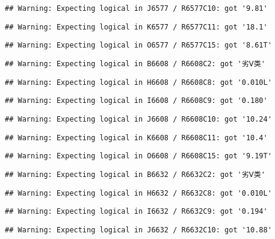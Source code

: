 \documentclass[
]{article}
\begin{document}
\begin{verbatim}
## Warning: Expecting logical in J6577 / R6577C10: got '9.81'
\end{verbatim}

\begin{verbatim}
## Warning: Expecting logical in K6577 / R6577C11: got '18.1'
\end{verbatim}

\begin{verbatim}
## Warning: Expecting logical in O6577 / R6577C15: got '8.61T'
\end{verbatim}

\begin{verbatim}
## Warning: Expecting logical in B6608 / R6608C2: got '劣Ⅴ类'
\end{verbatim}

\begin{verbatim}
## Warning: Expecting logical in H6608 / R6608C8: got '0.010L'
\end{verbatim}

\begin{verbatim}
## Warning: Expecting logical in I6608 / R6608C9: got '0.180'
\end{verbatim}

\begin{verbatim}
## Warning: Expecting logical in J6608 / R6608C10: got '10.24'
\end{verbatim}

\begin{verbatim}
## Warning: Expecting logical in K6608 / R6608C11: got '10.4'
\end{verbatim}

\begin{verbatim}
## Warning: Expecting logical in O6608 / R6608C15: got '9.19T'
\end{verbatim}

\begin{verbatim}
## Warning: Expecting logical in B6632 / R6632C2: got '劣Ⅴ类'
\end{verbatim}

\begin{verbatim}
## Warning: Expecting logical in H6632 / R6632C8: got '0.010L'
\end{verbatim}

\begin{verbatim}
## Warning: Expecting logical in I6632 / R6632C9: got '0.194'
\end{verbatim}

\begin{verbatim}
## Warning: Expecting logical in J6632 / R6632C10: got '10.88'
\end{verbatim}
\end{document}
